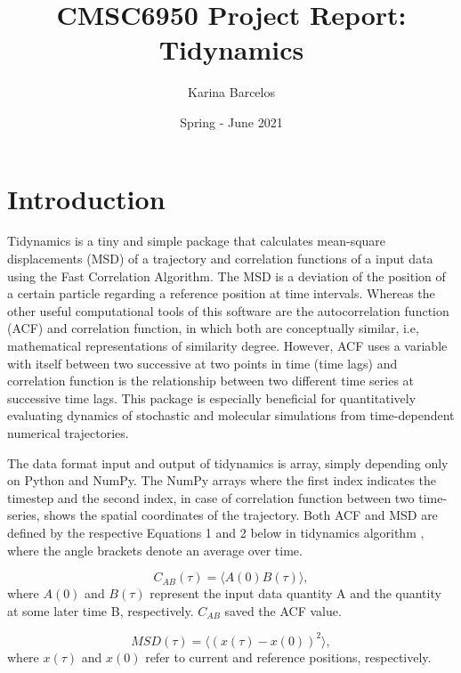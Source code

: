 \documentclass{article}
\title{CMSC6950 Project Report: Tidynamics}
\author{Karina Barcelos}
\date{Spring - June 2021}
\begin{document}
\maketitle

\section{Introduction}

Tidynamics \cite{Buyl2018} is a tiny and simple package that calculates mean-square displacements (MSD) of a trajectory and correlation functions of a input data using the Fast Correlation Algorithm. \cite{kneller1995nmoldyn} The MSD is a deviation of the position of a certain particle regarding a reference position at time intervals. Whereas the other useful computational tools of this software are the autocorrelation function (ACF) and correlation function, in which both are conceptually similar, i.e, mathematical representations of similarity degree. However, ACF uses a variable with itself between two successive at two points in time (time lags) and correlation function is the relationship between two different time series at successive time lags. This package is especially beneficial for quantitatively evaluating dynamics of stochastic and molecular simulations from time-dependent numerical trajectories.
 
The data format input and output of tidynamics \cite{Buyl2018} is array, simply depending only on Python and NumPy. The NumPy arrays where the first index indicates the timestep and the second index, in case of correlation function between two time-series, shows the spatial coordinates of the trajectory. Both ACF and MSD are defined by the respective Equations 1 and 2 below in tidynamics algorithm \cite{Buyl2018}, where the angle brackets denote an average over time. \cite{kneller1995nmoldyn}

\begin{equation}
C_{AB}(\tau) = \langle A(0) B(\tau) \rangle,
\label{eqn:correlation}
\end{equation}
where  $A(0)$ and $B(\tau)$ represent the input data quantity A and the quantity at some later time B, respectively. $C_{AB}$ saved the ACF value.

\begin{equation}
MSD(\tau) = \langle (x(\tau) - x(0) )^2 \rangle,
\label{eqn:msd}
\end{equation}
where $x(\tau)$ and $x(0)$ refer to current and reference positions, respectively.
\end{document}
